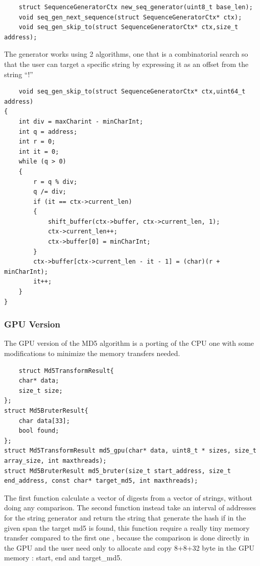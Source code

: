 \documentclass[12pt,a4paper]{article}
\begin{document}
\begin{lstlisting}
    struct SequenceGeneratorCtx new_seq_generator(uint8_t base_len);
    void seq_gen_next_sequence(struct SequenceGeneratorCtx* ctx);
    void seq_gen_skip_to(struct SequenceGeneratorCtx* ctx,size_t address);
\end{lstlisting}

The generator works using 2 algorithms, one that is a combinatorial search so that the user can target a specific string by expressing it as an offset from the string ``!'' 

\begin{lstlisting}
    void seq_gen_skip_to(struct SequenceGeneratorCtx* ctx,uint64_t address)
{
    int div = maxCharint - minCharInt;
    int q = address;
    int r = 0;
    int it = 0;
    while (q > 0)
    {
        r = q % div;
        q /= div;
        if (it == ctx->current_len)
        {
            shift_buffer(ctx->buffer, ctx->current_len, 1); 
            ctx->current_len++;
            ctx->buffer[0] = minCharInt;
        }
        ctx->buffer[ctx->current_len - it - 1] = (char)(r + minCharInt);
        it++;
    }
}

\end{lstlisting}


\subsubsection{GPU Version}
The GPU version of the MD5 algorithm is a porting of the CPU one with some modifications to minimize the memory transfers needed.

\begin{lstlisting}
    struct Md5TransformResult{
    char* data;
    size_t size;
}; 
struct Md5BruterResult{
    char data[33];
    bool found;
};
struct Md5TransformResult md5_gpu(char* data, uint8_t * sizes, size_t array_size, int maxthreads);
struct Md5BruterResult md5_bruter(size_t start_address, size_t end_address, const char* target_md5, int maxthreads);
\end{lstlisting}

The first function calculate a vector of digests from a vector of strings, without doing any comparison. The second function instead take an interval of addresses for the string generator and return the string that generate the hash if in the given span the target md5 is found, this function require a really tiny memory transfer compared to the first one , because the comparison is done directly in the GPU and the user need only to allocate and copy 8+8+32 byte in the GPU memory : start, end and target\_md5.
\end{document}
